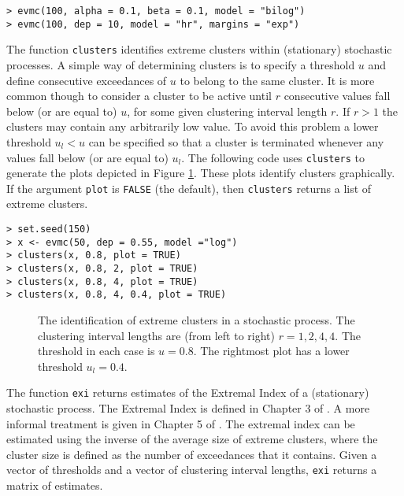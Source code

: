 \documentclass[11pt,a4paper]{article}
\begin{document}
\begin{verbatim}
> evmc(100, alpha = 0.1, beta = 0.1, model = "bilog")
> evmc(100, dep = 10, model = "hr", margins = "exp")
\end{verbatim}

The function \verb+clusters+ identifies extreme clusters within (stationary) stochastic processes. A simple way of determining clusters is to specify a threshold $u$ and define consecutive exceedances of $u$ to belong to the same cluster.
It is more common though to consider a cluster to be active until $r$ consecutive values fall below (or are equal to) $u$, for some given clustering interval length $r$.
If $r > 1$ the clusters may contain any arbitrarily low value.
To avoid this problem a lower threshold $u_l < u$ can be specified so that a cluster is terminated whenever any values fall below (or are equal to) $u_l$.
The following code uses \verb+clusters+ to generate the plots depicted in Figure \ref{clust}. 
These plots identify clusters graphically.
If the argument \verb+plot+ is \verb+FALSE+ (the default), then \verb+clusters+ returns a list of extreme clusters.        

\begin{verbatim}
> set.seed(150)
> x <- evmc(50, dep = 0.55, model ="log")
> clusters(x, 0.8, plot = TRUE)
> clusters(x, 0.8, 2, plot = TRUE)
> clusters(x, 0.8, 4, plot = TRUE)
> clusters(x, 0.8, 4, 0.4, plot = TRUE)
\end{verbatim}

\begin{figure}
\begin{center}
\vspace{-1.5cm}
\hspace{0cm}
\hspace{0cm} 
\hspace{0cm}
\end{center} 
\caption{The identification of extreme clusters in a stochastic process. The clustering interval lengths are (from left to right) $r = 1,2,4,4$. The threshold in each case is $u = 0.8$. The rightmost plot has a lower threshold $u_l = 0.4$.}
\label{clust}
\end{figure}

The function \verb+exi+ returns estimates of the Extremal Index of a (stationary) stochastic process. The Extremal Index is defined in Chapter 3 of \citet{leadling83}. A more informal treatment is given in Chapter 5 of \citet{cole01}. The extremal index can be estimated using the inverse of the average size of extreme clusters, where the cluster size is defined as the number of exceedances that it contains. Given a vector of thresholds and a vector of clustering interval lengths, \verb+exi+ returns a matrix of estimates. 
\end{document}
